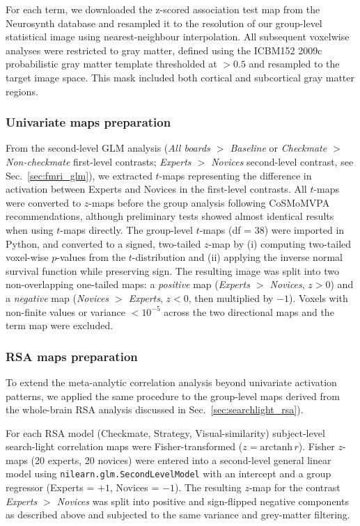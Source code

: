 \documentclass[preprint,12pt]{elsarticle}
\begin{document}
For each term, we downloaded the z-scored association test map from the Neurosynth database and resampled it to the resolution of our group-level statistical image using nearest-neighbour interpolation. All subsequent voxelwise analyses were restricted to gray matter, defined using the ICBM152 2009c probabilistic gray matter template thresholded at $>0.5$ and resampled to the target image space. This mask included both cortical and subcortical gray matter regions.

\subsubsection{Univariate maps preparation}
From the second-level GLM analysis (\emph{All boards $>$ Baseline} or \emph{Checkmate $>$ Non-checkmate} first-level contrasts; \emph{Experts $>$ Novices} second-level contrast, see Sec.~\ref{sec:fmri_glm}), we extracted $t$-maps representing the difference in activation between Experts and Novices in the first-level contrasts. All $t$-maps were converted to $z$-maps before the group analysis following CoSMoMVPA recommendations, although preliminary tests showed almost identical results when using $t$-maps directly. The group-level $t$-maps (df = 38) were imported in Python, and converted to a signed, two-tailed $z$-map by (i) computing two-tailed voxel-wise $p$-values from the $t$-distribution and (ii) applying the inverse normal survival function while preserving sign. The resulting image was split into two non-overlapping one-tailed maps: a \emph{positive} map (\emph{Experts $>$ Novices}, $z>0$) and a \emph{negative} map (\emph{Novices $>$ Experts}, $z<0$, then multiplied by $-1$). Voxels with non-finite values or variance $<10^{-5}$ across the two directional maps and the term map were excluded.

\subsubsection{RSA maps preparation}
To extend the meta-analytic correlation analysis beyond univariate activation patterns, we applied the same procedure to the group-level maps derived from the whole-brain RSA analysis discussed in Sec.~\ref{sec:searchlight_rsa}). 

For each RSA model (Checkmate, Strategy, Visual-similarity) subject-level search-light correlation maps were Fisher-transformed ($z\!=\!\text{arctanh}\,r$). Fisher $z$-maps (20 experts, 20 novices) were entered into a second-level general linear model using \texttt{nilearn.glm.SecondLevelModel} with an intercept and a group regressor (Experts = $+1$, Novices = $-1$).  The resulting $z$-map for the contrast \emph{Experts $>$ Novices} was split into positive and sign-flipped negative components as described above and subjected to the same variance and grey-matter filtering.
\end{document}
